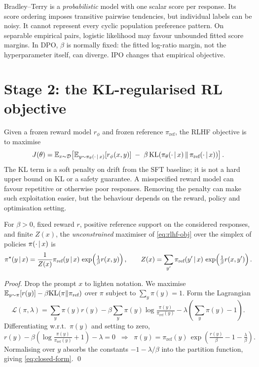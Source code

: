 \documentclass[11pt,oneside]{scrbook}
\begin{document}
\begin{pitfall}
Bradley--Terry is a \emph{probabilistic} model with one scalar score per response.
Its score ordering imposes transitive pairwise tendencies, but individual labels
can be noisy. It cannot represent every cyclic population preference pattern.
On separable empirical pairs, logistic likelihood may favour unbounded fitted
score margins. In DPO, $\beta$ is normally fixed: the fitted log-ratio margin,
not the hyperparameter itself, can diverge. IPO changes that empirical objective.

\end{pitfall}

\section{Stage 2: the KL-regularised RL objective}

Given a frozen reward model $r_\phi$ and frozen reference $\pi_{\text{ref}}$,
the RLHF objective is to maximise
\begin{equation}
J(\theta)
  = \mathbb{E}_{x \sim \mathcal{D}}\!\left[
      \mathbb{E}_{y \sim \pi_\theta(\cdot \,\vert\, x)}[r_\phi(x, y)]
    \;-\; \beta\, \mathrm{KL}\!\left(\pi_\theta(\cdot \,\vert\, x) \,\|\, \pi_{\text{ref}}(\cdot \,\vert\, x)\right)\right].
\label{eq:rlhf-obj}
\end{equation}
The KL term is a soft penalty on drift from the SFT baseline; it is not
a hard upper bound on KL or a safety guarantee. A misspecified reward model can favour repetitive or otherwise poor responses. Removing the penalty can make such exploitation easier, but the behaviour depends on the reward, policy and optimisation setting.

\begin{theorem}
\label{thm:closed-form}
For $\beta>0$, fixed reward $r$, positive reference support on the considered responses, and finite $Z(x)$, the
\emph{unconstrained} maximiser of \eqref{eq:rlhf-obj} over the
simplex of policies $\pi(\cdot \,\vert\, x)$ is
\begin{equation}
\pi^\star(y \,\vert\, x)
  = \frac{1}{Z(x)} \pi_{\text{ref}}(y \,\vert\, x)\, \exp\!\left(\tfrac{1}{\beta} r(x, y)\right),
\qquad
Z(x) = \sum_{y'} \pi_{\text{ref}}(y' \,\vert\, x)\, \exp\!\left(\tfrac{1}{\beta} r(x, y')\right).
\label{eq:closed-form}
\end{equation}
\end{theorem}
\begin{proof}
Drop the prompt $x$ to lighten notation. We maximise
$\mathbb{E}_{y \sim \pi}[r(y)] - \beta \mathrm{KL}(\pi \| \pi_{\text{ref}})$ over $\pi$ subject
to $\sum_y \pi(y) = 1$. Form the Lagrangian
\[
\mathcal{L}(\pi, \lambda) =
  \sum_y \pi(y) r(y) - \beta \sum_y \pi(y) \log\tfrac{\pi(y)}{\pi_{\text{ref}}(y)}
  - \lambda\!\left(\sum_y \pi(y) - 1\right).
\]
Differentiating w.r.t.\ $\pi(y)$ and setting to zero,
\[
r(y) - \beta\!\left(\log\tfrac{\pi(y)}{\pi_{\text{ref}}(y)} + 1\right) - \lambda = 0
\;\;\Longrightarrow\;\;
\pi(y) = \pi_{\text{ref}}(y)\, \exp\!\left(\tfrac{r(y)}{\beta} - 1 - \tfrac{\lambda}{\beta}\right).
\]
Normalising over $y$ absorbs the constants $-1 - \lambda/\beta$ into
the partition function, giving \eqref{eq:closed-form}. \qed
\end{proof}
\end{document}
